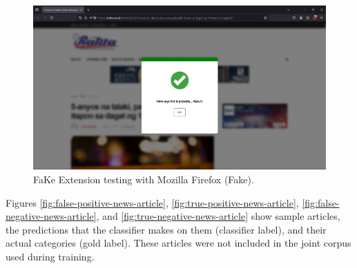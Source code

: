         \begin{figure}[h!]
            \centering
            \includegraphics[width=1\textwidth,height=1\textheight, keepaspectratio]{figures/Screenshots/firefox-true-negative.png}
            \caption{FaKe Extension testing with Mozilla Firefox (Fake).}
            \label{fig:fake-firefox-test}
        \end{figure}

        Figures \ref{fig:false-positive-news-article}, \ref{fig:true-positive-news-article}, \ref{fig:false-negative-news-article}, and \ref{fig:true-negative-news-article} show sample articles, the predictions that the classifier makes on them (classifier label), and their actual categories (gold label). These articles were not included in the joint corpus used during training.

